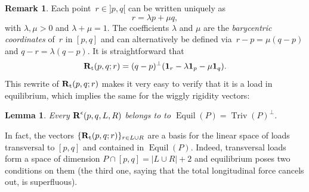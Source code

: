 \documentclass{amsart}
\newtheorem{lemma}[theorem]{Lemma}
\theoremstyle{definition}
\newtheorem{definition}[theorem]{Definition}
\newtheorem{remark}[theorem]{Remark}
\renewcommand{\b}[1]{{\boldsymbol{#1}}} %
\newcommand{\one}{\mathbf{1}} %
\newcommand{\darkblue}{\color{darkblue}} %
\newcommand{\defn}[1]{\textsl{\darkblue #1}} %
\newcommand{\vincent}[1]{\todo[size=\scriptsize, color=blue!30]{\rm #1 \\ \hfill --- V.}}
\newcommand{\paco}[1]{\todo[size=\scriptsize, color=orange!30]{\rm #1 \\ \hfill --- P.}}
\newcommand{\Rvector}{\b{\rm R}} %
\newcommand{\lon}{\operatorname{l}} %
\newcommand{\trans}{\operatorname{t}} %
\newcommand{\Rlong}{\Rvector_{\lon}} %
\newcommand{\Rtrans}{\Rvector_{\trans}} %
\newcommand{\Reps}{\Rvector^\epsilon} %
\newcommand{\Equil}{\operatorname{Equil} } %
\newcommand{\Triv}{\operatorname{Triv} } %
\begin{document}
\begin{remark}
\label{rem:barycentric}
Each point~$r \in {]p,q[}$ can be written uniquely as
\[
r = \lambda p + \mu  q,
\]
with $\lambda,\mu > 0$ and  $\lambda  + \mu  = 1$.
The coefficients  $\lambda$ and $\mu$ are the \defn{barycentric coordinates} of~$r$ in $[p,q]$ and can alternatively be defined via~$r-p = \mu  (q-p)$ and $q-r = \lambda  (q-p)$.
It is straightforward that
\[
\Rtrans(p,q;r)  = (q-p)^\perp (\one_r - \lambda \one_p - \mu \one_q).
\]
This rewrite of $\Rtrans(p,q;r)$ makes it very easy to verify that it is a load in equilibrium, which implies the same for the wiggly rigidity vectors:

\begin{lemma}
\label{lemma:kernel}
Every $\Reps(p,q,L,R)$ belongs to to $\Equil(P) = \Triv(P)^\perp$.
\end{lemma}

%

In fact, the vectors $\{\Rtrans(p,q;r)\}_{r\in L\cup R}$ are a basis for the  linear space of loads transversal to $[p,q]$ and contained in $\Equil(P)$. Indeed, transversal loads form a space of dimension $P\cap [p,q] = |L\cup R| +2$ and equilibrium poses two conditions on them (the third one, saying that the total longitudinal force cancels out, is superfluous).
\end{remark}



\end{document}
